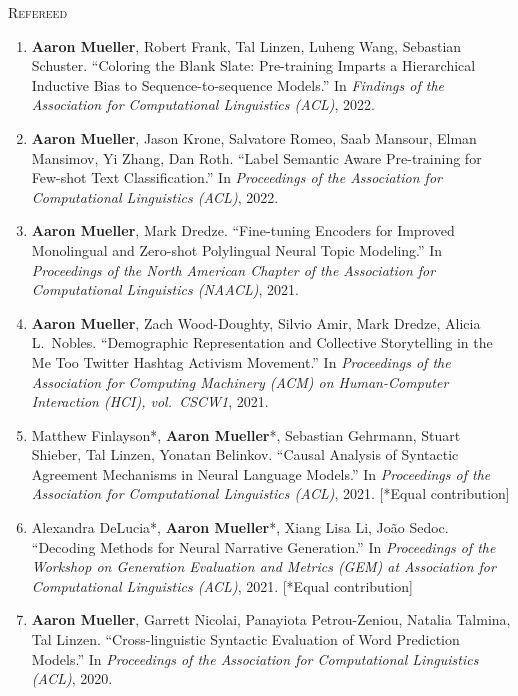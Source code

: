 \documentclass[10pt]{article}
\begin{document}
	\textsc{Refereed}
	\begin{enumerate}[leftmargin=*, topsep=0pt, itemsep=-1ex, partopsep=0ex, parsep=1ex]
	\item \textbf{Aaron Mueller}, Robert Frank, Tal Linzen, Luheng Wang, Sebastian Schuster. ``Coloring the Blank Slate: Pre-training Imparts a Hierarchical Inductive Bias to Sequence-to-sequence Models.'' In \emph{Findings of the Association for Computational Linguistics (ACL)}, 2022.

	\item \textbf{Aaron Mueller}, Jason Krone, Salvatore Romeo, Saab Mansour, Elman Mansimov, Yi Zhang, Dan Roth. ``Label Semantic Aware Pre-training for Few-shot Text Classification.'' In \emph{Proceedings of the Association for Computational Linguistics (ACL)}, 2022.
			
	\item \textbf{Aaron Mueller}, Mark Dredze. ``Fine-tuning Encoders for Improved Monolingual and Zero-shot Polylingual Neural Topic Modeling.'' In \emph{Proceedings of the North American Chapter of the Association for Computational Linguistics (NAACL)}, 2021.  
	
	\item \textbf{Aaron Mueller}, Zach Wood-Doughty, Silvio Amir, Mark Dredze, Alicia L.\ Nobles. ``Demographic Representation and Collective Storytelling in the Me Too Twitter Hashtag Activism Movement.'' In \emph{Proceedings of the Association for Computing Machinery (ACM) on Human-Computer Interaction (HCI), vol.\ CSCW1}, 2021.

	\item Matthew Finlayson*, \textbf{Aaron Mueller}*, Sebastian Gehrmann, Stuart Shieber, Tal Linzen, Yonatan Belinkov. ``Causal Analysis of Syntactic Agreement Mechanisms in Neural Language Models.'' In \emph{Proceedings of the Association for Computational Linguistics (ACL)}, 2021. [*Equal contribution]
	
	\item Alexandra DeLucia*, \textbf{Aaron Mueller}*, Xiang Lisa Li, João Sedoc. ``Decoding Methods for Neural Narrative Generation.'' In \emph{Proceedings of the Workshop on Generation Evaluation and Metrics (GEM) at Association for Computational Linguistics (ACL)}, 2021. [*Equal contribution]

	\item \textbf{Aaron Mueller}, Garrett Nicolai, Panayiota Petrou-Zeniou, Natalia Talmina, Tal Linzen. ``Cross-linguistic Syntactic Evaluation of Word Prediction Models.'' In \emph{Proceedings of the Association for Computational Linguistics (ACL)}, 2020.


\end{enumerate}
\end{document}
